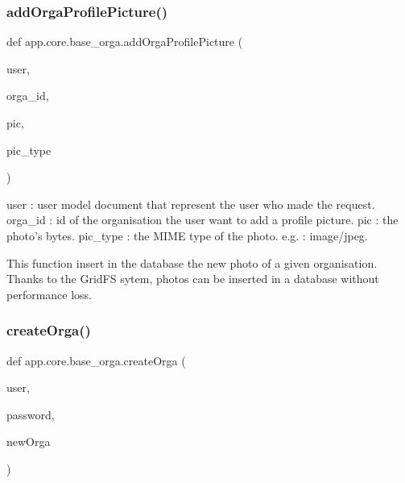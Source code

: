 \subsubsection{\texorpdfstring{add\+Orga\+Profile\+Picture()}{addOrgaProfilePicture()}}
{\footnotesize\ttfamily def app.\+core.\+base\+\_\+orga.\+add\+Orga\+Profile\+Picture (\begin{DoxyParamCaption}\item[{}]{user,  }\item[{}]{orga\+\_\+id,  }\item[{}]{pic,  }\item[{}]{pic\+\_\+type }\end{DoxyParamCaption})}

\begin{DoxyVerb}user : user model document that represent the user who made the request.
orga_id : id of the organisation the user want to add a profile picture.
pic : the photo's bytes.
pic_type : the MIME type of the photo. e.g. : image/jpeg.

This function insert in the database the new photo of a given organisation.
Thanks to the GridFS sytem, photos can be inserted in a database without performance loss.
\end{DoxyVerb}
 \mbox{\label{namespaceapp_1_1core_1_1base__orga_acd280d85676753be745926d2671511b3}} 
\subsubsection{\texorpdfstring{create\+Orga()}{createOrga()}}
{\footnotesize\ttfamily def app.\+core.\+base\+\_\+orga.\+create\+Orga (\begin{DoxyParamCaption}\item[{}]{user,  }\item[{}]{password,  }\item[{}]{new\+Orga }\end{DoxyParamCaption})}


